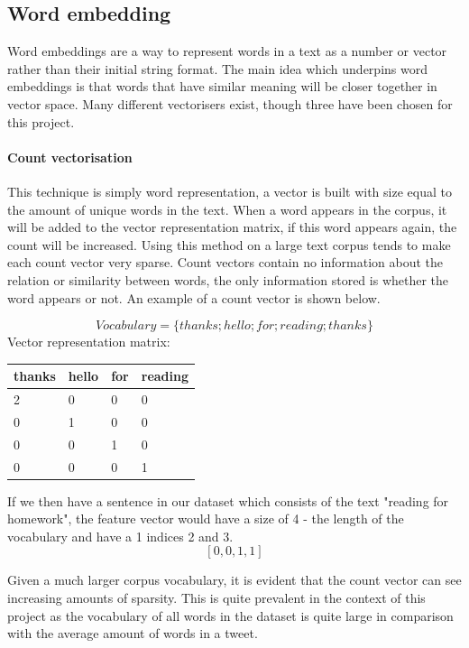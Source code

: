 \documentclass[conference]{IEEEtran}
\begin{document}
\subsection{Word embedding}
Word embeddings are a way to represent words in a text as a number or vector rather than their initial string format. The main idea which underpins word embeddings is that words that have similar meaning will be closer together in vector space. Many different vectorisers exist, though three have been chosen for this project.\\

\paragraph{\textbf{Count vectorisation}} This technique is simply word representation, a vector is built with size equal to the amount of unique words in the text. When a word appears in the corpus, it will be added to the vector representation matrix, if this word appears again, the count will be increased. Using this method on a large text corpus tends to make each count vector very sparse. Count vectors contain no information about the relation or similarity between words, the only information stored is whether the word appears or not. An example of a count vector is shown below.

\[Vocabulary = \{thanks; hello; for; reading; thanks\} \] 
Vector representation matrix:
\begin{table}[H]
\centering
\begin{tabular}{|l|l|l|l|}
\hline
thanks & hello & for & reading \\ \hline
2      &   0   &  0  &    0 \\ \hline
0      &   1   &  0  &    0 \\ \hline
0      &   0   &  1  &    0 \\ \hline
0      &   0   &  0  &    1 \\ \hline
\end{tabular}
\end{table}

If we then have a sentence in our dataset which consists of the text "reading for homework", the feature vector would have a size of 4 - the length of the vocabulary and have a 1 indices 2 and 3.
\[ [0, 0, 1, 1]\]

Given a much larger corpus vocabulary, it is evident that the count vector can see increasing amounts of sparsity. This is quite prevalent in the context of this project as the vocabulary of all words in the dataset is quite large in comparison with the average amount of words in a tweet.\\
\end{document}
